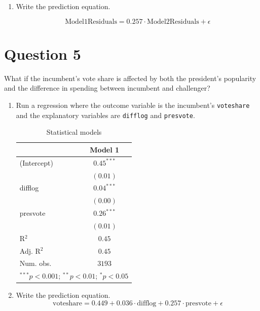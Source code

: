 \documentclass[12pt,letterpaper]{article}
\begin{document}
\begin{enumerate}
		
		\item Write the prediction equation.
		
		\begin{equation*}
			\text{Model1Residuals} = 0.257 \cdot \text{Model2Residuals} + \epsilon
		\end{equation*}

	\end{enumerate}
	
	\newpage	

\section*{Question 5}
\noindent What if the incumbent's vote share is affected by both the president's popularity and the difference in spending between incumbent and challenger? 
	\begin{enumerate}
		\item Run a regression where the outcome variable is the incumbent's \texttt{voteshare} and the explanatory variables are \texttt{difflog} and \texttt{presvote}.	
		
								 
		
		\begin{table}[H]
\begin{center}
\begin{tabular}{l c}
\hline
 & Model 1 \\
\hline
(Intercept) & $0.45^{***}$ \\
            & $(0.01)$     \\
difflog     & $0.04^{***}$ \\
            & $(0.00)$     \\
presvote    & $0.26^{***}$ \\
            & $(0.01)$     \\
\hline
R$^2$       & $0.45$       \\
Adj. R$^2$  & $0.45$       \\
Num. obs.   & $3193$       \\
\hline
\multicolumn{2}{l}{\scriptsize{$^{***}p<0.001$; $^{**}p<0.01$; $^{*}p<0.05$}}
\end{tabular}
\caption{Statistical models}
\label{table:coefficients}
\end{center}
\end{table}

		\item Write the prediction equation.			
		\begin{equation*}
			\text{voteshare} = 0.449 + 0.036 \cdot \text{difflog} + 0.257 \cdot \text{presvote} + \epsilon
		\end{equation*}
				

\end{enumerate}
\end{document}
